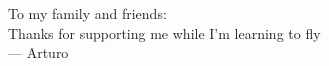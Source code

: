 \thispagestyle{empty}
{}

\vspace*{3cm}
\begin{center}
    To my family and friends: \\ \medskip
    Thanks for supporting me while I'm learning to fly  \\ \medskip
    --- Arturo
\end{center}